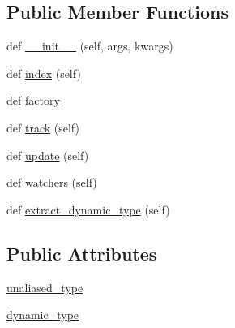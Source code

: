 \subsection*{Public Member Functions}
\begin{DoxyCompactItemize}
\item 
def \hyperlink{classmemoryoracle_1_1instance_1_1Memory_a2ab9b46d55c08afd748f50c3f4076116}{\+\_\+\+\_\+init\+\_\+\+\_\+} (self, args, kwargs)
\item 
def \hyperlink{classmemoryoracle_1_1instance_1_1Memory_aba9e6136a3854e0ab59a74acd015be06}{index} (self)
\item 
def \hyperlink{classmemoryoracle_1_1instance_1_1Memory_a050f3787032e0228d9c15baec68ca278}{factory}
\item 
def \hyperlink{classmemoryoracle_1_1instance_1_1Memory_a8951ac234fecbd6cd473133ae7e63662}{track} (self)
\item 
def \hyperlink{classmemoryoracle_1_1instance_1_1Memory_aa937ea1a82dcaa2fa1c868a387d59483}{update} (self)
\item 
def \hyperlink{classmemoryoracle_1_1instance_1_1Memory_af30ce86ef3f667c334f9217c8a699f9e}{watchers} (self)
\item 
def \hyperlink{classmemoryoracle_1_1instance_1_1Memory_acde5472399a5335909aca575b634dde7}{extract\+\_\+dynamic\+\_\+type} (self)
\end{DoxyCompactItemize}
\subsection*{Public Attributes}
\begin{DoxyCompactItemize}
\item 
\hyperlink{classmemoryoracle_1_1instance_1_1Memory_ac7778b85299f2e28765771174a43b1cd}{unaliased\+\_\+type}
\item 
\hyperlink{classmemoryoracle_1_1instance_1_1Memory_a99da30d4d3ea15d582a12b273ac7bee1}{dynamic\+\_\+type}
\end{DoxyCompactItemize}
